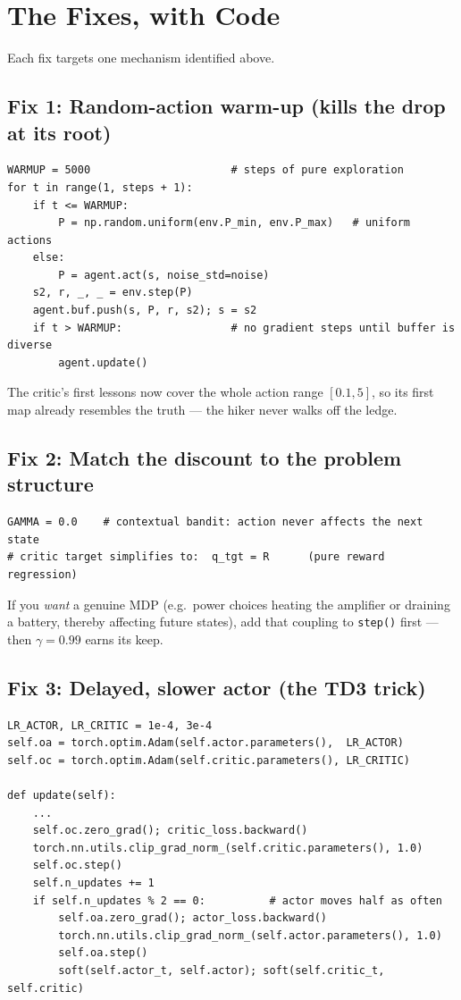 \documentclass[11pt]{article}
\begin{document}
\section{The Fixes, with Code}

Each fix targets one mechanism identified above.

\subsection{Fix 1: Random-action warm-up (kills the drop at its root)}

\begin{lstlisting}
WARMUP = 5000                      # steps of pure exploration
for t in range(1, steps + 1):
    if t <= WARMUP:
        P = np.random.uniform(env.P_min, env.P_max)   # uniform actions
    else:
        P = agent.act(s, noise_std=noise)
    s2, r, _, _ = env.step(P)
    agent.buf.push(s, P, r, s2); s = s2
    if t > WARMUP:                 # no gradient steps until buffer is diverse
        agent.update()
\end{lstlisting}

The critic's first lessons now cover the whole action range $[0.1,5]$, so its first
map already resembles the truth --- the hiker never walks off the ledge.

\subsection{Fix 2: Match the discount to the problem structure}

\begin{lstlisting}
GAMMA = 0.0    # contextual bandit: action never affects the next state
# critic target simplifies to:  q_tgt = R      (pure reward regression)
\end{lstlisting}

If you \emph{want} a genuine MDP (e.g.\ power choices heating the amplifier or
draining a battery, thereby affecting future states), add that coupling to
\texttt{step()} first --- then $\gamma=0.99$ earns its keep.

\subsection{Fix 3: Delayed, slower actor (the TD3 trick)}

\begin{lstlisting}
LR_ACTOR, LR_CRITIC = 1e-4, 3e-4
self.oa = torch.optim.Adam(self.actor.parameters(),  LR_ACTOR)
self.oc = torch.optim.Adam(self.critic.parameters(), LR_CRITIC)

def update(self):
    ...
    self.oc.zero_grad(); critic_loss.backward()
    torch.nn.utils.clip_grad_norm_(self.critic.parameters(), 1.0)
    self.oc.step()
    self.n_updates += 1
    if self.n_updates % 2 == 0:          # actor moves half as often
        self.oa.zero_grad(); actor_loss.backward()
        torch.nn.utils.clip_grad_norm_(self.actor.parameters(), 1.0)
        self.oa.step()
        soft(self.actor_t, self.actor); soft(self.critic_t, self.critic)
\end{lstlisting}
\end{document}

